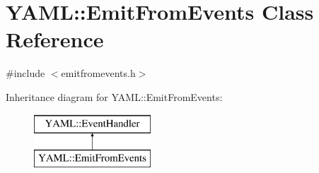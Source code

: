 \hypertarget{class_y_a_m_l_1_1_emit_from_events}{}\section{Y\+A\+ML\+::Emit\+From\+Events Class Reference}
\label{class_y_a_m_l_1_1_emit_from_events}


{\ttfamily \#include $<$emitfromevents.\+h$>$}

Inheritance diagram for Y\+A\+ML\+::Emit\+From\+Events\+:\begin{figure}[H]
\begin{center}
\leavevmode
\includegraphics[height=2.000000cm]{class_y_a_m_l_1_1_emit_from_events}
\end{center}
\end{figure}
